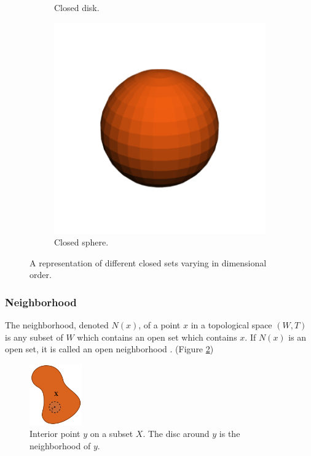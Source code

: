 \documentclass[a4paper,11pt,oneside]{article}
\begin{document}
\begin{figure}[ht]
\begin{subfigure}[b]{0.2\textwidth}
         \caption{Closed disk.}
     \end{subfigure}
     \hfill
     \begin{subfigure}[b]{0.2\textwidth}
         \centering
         \includegraphics[width=\textwidth]{section3/3.2/closed-sphere.png}
         \caption{Closed sphere.}
     \end{subfigure}
     \hfill
        \caption{A representation of different closed sets varying in dimensional order.}
        \label{sec3.2:closed-sets}
\end{figure}

\subsubsection{Neighborhood}
     
\begin{definition}
	The neighborhood, denoted $N(x)$, of a point $x$ in a topological space $(W, T)$ is any subset of $W$ which contains an open set which contains $x$. If $N(x)$ is an open set, it is called an open neighborhood \cite{Requicha1978MathematicalFO}. (Figure \ref{sec3.2:interior-neighborhood})
\end{definition}

\begin{figure}[ht]
	\begin{center}
		\includegraphics[width=0.2\textwidth]{section3/3.2/interior.png}
	\end{center}
	\caption{Interior point $y$ on a subset $X$. The disc around $y$ is the neighborhood of $y$.}
	\label{sec3.2:interior-neighborhood}
\end{figure}
    
\end{document}

